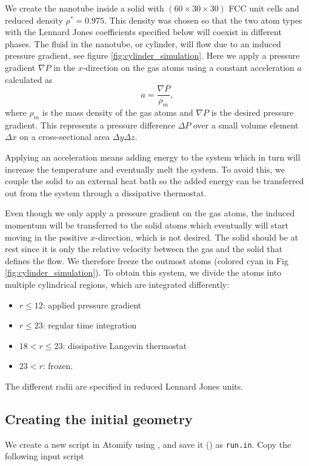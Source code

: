 \documentclass[12pt,a4paper,final]{iopart}
\newcommand{\code}[1]{\colorbox{light-gray}{\color{RawSienna}\texttt{#1}}}
\begin{document}
We create the nanotube inside a solid with  $(60\times30\times30)$ FCC unit cells and reduced density $\rho^* = 0.975$.
This density was chosen so that the two atom types with the Lennard Jones coefficients specified below will coexist in different phases.
The fluid in the nanotube, or cylinder, will flow due to an induced pressure gradient, see figure \ref{fig:cylinder_simulation}.
Here we apply a pressure gradient $\nabla P$ in the $x$-direction on the gas atoms using a constant acceleration $a$ calculated as
\[
    a = \frac{\nabla P}{\rho_m},
\]
where $\rho_m$ is the mass density of the gas atoms and $\nabla P$ is the desired pressure gradient.
This represents a pressure difference $\Delta P$ over a small volume element $\Delta x$ on a cross-sectional area $\Delta y\Delta z$.

Applying an acceleration means adding energy to the system which in turn will increase the temperature and eventually melt the system.
To avoid this, we couple the solid to an external heat bath so the added energy can be transferred out from the system through a dissipative thermostat.

Even though we only apply a pressure gradient on the gas atoms, the induced momentum will be transferred
to the solid atoms which eventually will start moving in the positive $x$-direction, which is not desired.
The solid should be at rest since it is only the relative velocity between the gas and the solid that defines
the flow. We therefore freeze the outmost atoms (colored cyan in Fig \ref{fig:cylinder_simulation}).
To obtain this system, we divide the atoms into multiple cylindrical regions, which are integrated differently:

\begin{itemize}
	\item $r \leq 12$: applied pressure gradient
	\item $r \leq 23$: regular time integration
	\item $18 < r \leq 23$: dissipative Langevin thermostat
	\item $23 < r$: frozen.
\end{itemize}
The different radii are specified in reduced Lennard Jones units.

\subsection{Creating the initial geometry}
We create a new script in Atomify using , and save it () as \code{run.in}.
Copy the following input script
\end{document}
